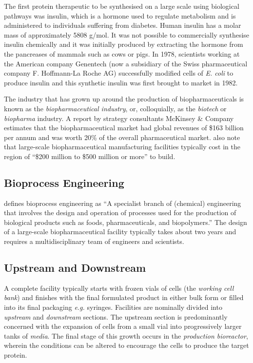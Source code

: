 The first protein therapeutic to be synthesised on a large scale using 
biological pathways was insulin, which is a hormone used to regulate metabolism
and is administered to individuals suffering from diabetes.  Human insulin has a
molar mass of approximately 5808 g/mol.  It was not possible to commercially
synthesise insulin chemically and it was initially produced by extracting the
hormone from the pancreases of mammals such as cows or pigs.  In 1978, 
scientists working at  the American company Genentech (now a subsidiary of the
Swiss pharmaceutical company F. Hoffmann-La Roche AG) successfully modified 
cells of \textit{E. coli} to produce insulin and this synthetic insulin was
first brought to market in 1982.

The industry that has grown up around the production of biopharmaceuticals is 
known as the \emph{biopharmaceutical industry}, or, colloquially, as the
\emph{biotech} or \emph{biopharma} industry.  A report by strategy consultants
McKinsey \& Company \citep{Otto:2014} estimates that the biopharmaceutical 
market had global revenues of \$163 billion per annum and was worth 20\% of the
overall pharmaceutical market.  \citet{Otto:2014} also note that large-scale
biopharmaceutical manufacturing facilities typically cost in the region of
``\$200 million to \$500 million or more'' to build.

\subsection{Bioprocess Engineering}\label{SS.bioproceng}

\citet{Schaschke:2014} defines bioprocess engineering as ``A specialist branch
of (chemical) engineering that involves the design and operation of processes
used for the production of biological products such as foods, pharmaceuticals,
and biopolymers.''  The design of a large-scale biopharmaceutical facility
typically takes about two years and requires a multidisciplinary team of
engineers and scientists.

\subsection{Upstream and Downstream}\label{SS.updown}

A complete facility typically starts with frozen vials of cells (the 
\emph{working cell bank}) and finishes with the final formulated product in
either bulk form or filled into its final packaging \textit{e.g.} syringes.
Facilities are nominally divided into \emph{upstream} and \emph{downstream} 
sections.
The upstream section is predominantly concerned with the expansion of cells
from a small vial into progressively larger tanks of \emph{media}.  
The final stage of this growth occurs in the \emph{production bioreactor}, 
wherein the conditions can be altered to encourage the cells to produce the 
target protein.

